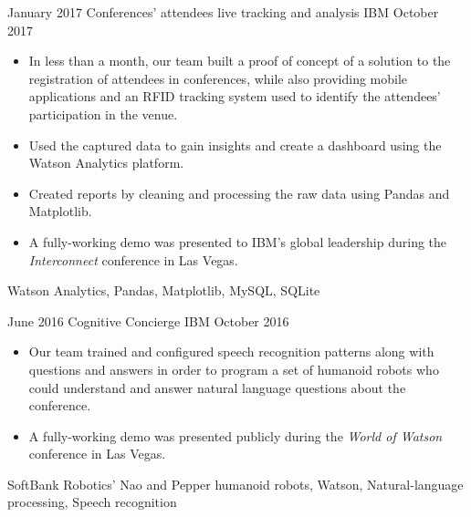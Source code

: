 %
%
%


\begin{projects}

    \project
        {January 2017}
        {Conferences' attendees live tracking and analysis}
        {IBM}
        {October 2017}
        {
            \begin{itemize}
                \item In less than a month, our team built a proof of concept 
                    of a solution to the registration of attendees in 
                    conferences, while also providing mobile applications and 
                    an RFID tracking system used to identify the attendees' 
                    participation in the venue.
                \item Used the captured data to gain insights and create a 
                    dashboard using the Watson Analytics platform.
                \item Created reports by cleaning and processing the raw data 
                    using Pandas and Matplotlib.
                \item A fully-working demo was presented to IBM's global 
                    leadership during the \textit{Interconnect} conference in 
                    Las Vegas.
            \end{itemize}
        }
        {
            Watson Analytics,
            Pandas,
            Matplotlib,
            MySQL,
            SQLite
        }

    \emptySeparator

    \project
        {June 2016}
        {Cognitive Concierge}
        {IBM}
        {October 2016}
        {
            \begin{itemize}
                \item Our team trained and configured 
                    speech recognition patterns along with questions and 
                    answers in order to program a set of humanoid robots who 
                    could understand and answer natural language questions 
                    about the conference.
                \item A fully-working demo was presented publicly during the 
                    \textit{World of Watson} conference in Las Vegas.
            \end{itemize}
        }
        {
            SoftBank Robotics' Nao and Pepper humanoid robots,
            Watson,
            Natural-language processing,
            Speech recognition
        }


\end{projects}
